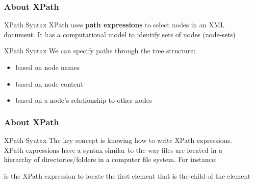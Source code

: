 \documentclass{beamer}\usepackage[]{graphicx}\usepackage[]{color}
\begin{document}
\begin{frame}
\frametitle{About XPath}

\begin{block}{XPath Syntax}
XPath uses \textbf{path expressions} to select nodes in an XML document. It has a computational model to identify sets of nodes (node-sets)
\end{block}

\begin{block}{XPath Syntax}
We can specify paths through the tree structure:
\begin{itemize}
 \item based on node names
 \item based on node content
 \item based on a node's relationship to other nodes
\end{itemize}
\end{block}

\end{frame}


\begin{frame}[fragile]
\frametitle{About XPath}

\begin{block}{XPath Syntax}
The key concept is knowing how to write XPath expressions. XPath expressions have a syntax similar to the way files are located in a hierarchy of directories/folders in a computer file system. For instance:
\end{block}


\vspace{3mm}
is the XPath expression to locate the first  element that is the child of the  element

\end{frame}

\end{document}
